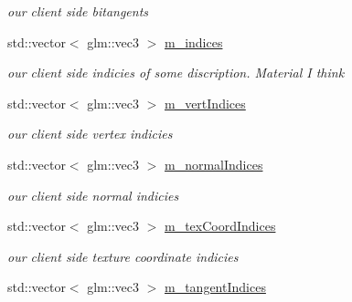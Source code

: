 \begin{DoxyCompactItemize}
\begin{DoxyCompactList}\small\item\em our client side bitangents \end{DoxyCompactList}\item 
std\-::vector$<$ glm\-::vec3 $>$ \hyperlink{class_opti_x_model_a4ef713de613b12da4e49a7599516b081}{m\-\_\-indices}
\begin{DoxyCompactList}\small\item\em our client side indicies of some discription. Material I think \end{DoxyCompactList}\item 
\hypertarget{class_opti_x_model_ad2defa4bcd86318249396cc658f6c16c}{std\-::vector$<$ glm\-::vec3 $>$ \hyperlink{class_opti_x_model_ad2defa4bcd86318249396cc658f6c16c}{m\-\_\-vert\-Indices}}\label{class_opti_x_model_ad2defa4bcd86318249396cc658f6c16c}

\begin{DoxyCompactList}\small\item\em our client side vertex indicies \end{DoxyCompactList}\item 
\hypertarget{class_opti_x_model_a6f402e8e41ae2a26d8670284dda931f7}{std\-::vector$<$ glm\-::vec3 $>$ \hyperlink{class_opti_x_model_a6f402e8e41ae2a26d8670284dda931f7}{m\-\_\-normal\-Indices}}\label{class_opti_x_model_a6f402e8e41ae2a26d8670284dda931f7}

\begin{DoxyCompactList}\small\item\em our client side normal indicies \end{DoxyCompactList}\item 
\hypertarget{class_opti_x_model_a08463933d695b3d78989c79b7123f5fc}{std\-::vector$<$ glm\-::vec3 $>$ \hyperlink{class_opti_x_model_a08463933d695b3d78989c79b7123f5fc}{m\-\_\-tex\-Coord\-Indices}}\label{class_opti_x_model_a08463933d695b3d78989c79b7123f5fc}

\begin{DoxyCompactList}\small\item\em our client side texture coordinate indicies \end{DoxyCompactList}\item 
\hypertarget{class_opti_x_model_a3baa4b3f8be71f5ca246e095a1b4ea46}{std\-::vector$<$ glm\-::vec3 $>$ \hyperlink{class_opti_x_model_a3baa4b3f8be71f5ca246e095a1b4ea46}{m\-\_\-tangent\-Indices}}\label{class_opti_x_model_a3baa4b3f8be71f5ca246e095a1b4ea46}


\end{DoxyCompactItemize}
